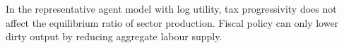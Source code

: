 	\begin{comment}
	To see this write:
\begin{align}
	\frac{d\left(\frac{Y_d}{Y_c}\right)}{d \tau_l}=\frac{Y_d}{Y_c}\left(\frac{\frac{dY_d}{Y_d}}{d \tau_l}-\frac{\frac{dY_c}{Y_c}}{d \tau_l}\right)=0
\end{align}
and observe that the percentage change in sector output is homogeneous. 
\begin{align}
	\frac{1}{Y_d}\frac{dY_d}{d \tau_l}= \frac{1}{L_d}\frac{d L_d}{d \tau_l}=\frac{1}{H}\frac{d H}{d \tau_l}\ \text{and} \ \frac{1}{Y_c}\frac{dY_c}{d \tau_l}= \frac{1}{L_c}\frac{d L_c}{d \tau_l}=\frac{1}{H}\frac{d H}{d \tau_l}.
\end{align}
\textbf{}
content...
\end{comment}

\begin{prop}
	In the representative agent model with log utility, tax progressivity does not affect the equilibrium ratio of sector production. Fiscal policy can only lower dirty output by reducing aggregate labour supply.
\end{prop}

